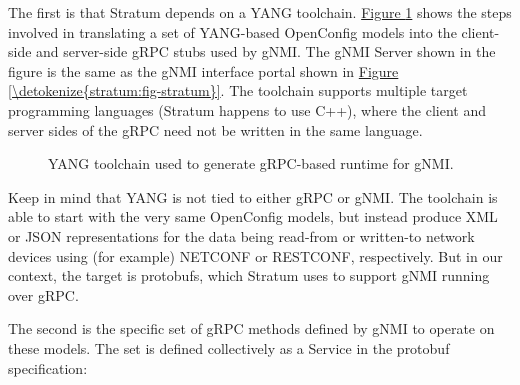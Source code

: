 \documentclass[letterpaper,11pt,english]{sphinxmanual}
\let\sphinxpxdimen\pdfpxdimen\else\newdimen\sphinxpxdimen
\begin{document}
The first is that Stratum depends on a YANG toolchain. \hyperref[\detokenize{stratum:fig-yang}]{Figure
\ref{\detokenize{stratum:fig-yang}}} shows the steps involved in translating a set of
YANG-based OpenConfig models into the client-side and server-side gRPC
stubs used by gNMI. The gNMI Server shown in the figure is the same as
the gNMI interface portal shown in \hyperref[\detokenize{stratum:fig-stratum}]{Figure \ref{\detokenize{stratum:fig-stratum}}}. The toolchain supports multiple target programming
languages (Stratum happens to use C++), where the client and server
sides of the gRPC need not be written in the same language.

\begin{figure}[htbp]
\centering
\capstart

\noindent\sphinxincludegraphics[width=550\sphinxpxdimen]{{Slide25}.png}
\caption{YANG toolchain used to generate gRPC-based runtime for gNMI.}\label{\detokenize{stratum:id5}}\label{\detokenize{stratum:fig-yang}}\end{figure}

Keep in mind that YANG is not tied to either gRPC or gNMI. The
toolchain is able to start with the very same OpenConfig models, but
instead produce XML or JSON representations for the data being
read-from or written-to network devices using (for example) NETCONF or
RESTCONF, respectively. But in our context, the target is protobufs,
which Stratum uses to support gNMI running over gRPC.

The second is the specific set of gRPC methods defined by gNMI to
operate on these models. The set is defined collectively as a Service
in the protobuf specification:

\begin{sphinxVerbatim}[commandchars=\\\{\}]
  
           
           
           
             
\end{sphinxVerbatim}
\end{document}

